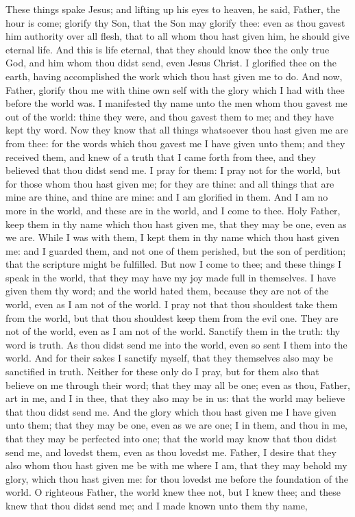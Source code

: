 These things spake Jesus; and lifting up his eyes to heaven, he said, Father, the hour is come; glorify thy Son, that the Son may glorify thee: even as thou gavest him authority over all flesh, that to all whom thou hast given him, he should give eternal life. And this is life eternal, that they should know thee the only true God, and him whom thou didst send, even Jesus Christ. I glorified thee on the earth, having accomplished the work which thou hast given me to do. And now, Father, glorify thou me with thine own self with the glory which I had with thee before the world was. I manifested thy name unto the men whom thou gavest me out of the world: thine they were, and thou gavest them to me; and they have kept thy word. Now they know that all things whatsoever thou hast given me are from thee: for the words which thou gavest me I have given unto them; and they received them, and knew of a truth that I came forth from thee, and they believed that thou didst send me. I pray for them: I pray not for the world, but for those whom thou hast given me; for they are thine: and all things that are mine are thine, and thine are mine: and I am glorified in them. And I am no more in the world, and these are in the world, and I come to thee. Holy Father, keep them in thy name which thou hast given me, that they may be one, even as we are. While I was with them, I kept them in thy name which thou hast given me: and I guarded them, and not one of them perished, but the son of perdition; that the scripture might be fulfilled. But now I come to thee; and these things I speak in the world, that they may have my joy made full in themselves. I have given them thy word; and the world hated them, because they are not of the world, even as I am not of the world. I pray not that thou shouldest take them from the world, but that thou shouldest keep them from the evil one. They are not of the world, even as I am not of the world. Sanctify them in the truth: thy word is truth. As thou didst send me into the world, even so sent I them into the world. And for their sakes I sanctify myself, that they themselves also may be sanctified in truth. Neither for these only do I pray, but for them also that believe on me through their word; that they may all be one; even as thou, Father, art in me, and I in thee, that they also may be in us: that the world may believe that thou didst send me. And the glory which thou hast given me I have given unto them; that they may be one, even as we are one; I in them, and thou in me, that they may be perfected into one; that the world may know that thou didst send me, and lovedst them, even as thou lovedst me. Father, I desire that they also whom thou hast given me be with me where I am, that they may behold my glory, which thou hast given me: for thou lovedst me before the foundation of the world. O righteous Father, the world knew thee not, but I knew thee; and these knew that thou didst send me; and I made known unto them thy name, 